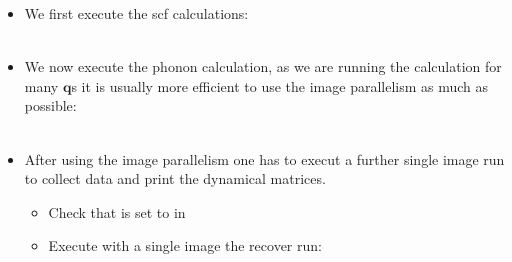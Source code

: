 \documentclass[landscape]{foils}
\begin{document}
\begin{itemize} 
	
	\item We first execute the scf calculations:\\
		\\ 
	\item We now execute the phonon calculation, as we are running the calculation for many  $\mathbf{q}$s it is usually more efficient 
		to use the image parallelism as much as possible: \\
	         \\ 
	\item After using the image parallelism one has to execut a further single image  run to collect data and print the dynamical matrices. 
		\begin{itemize}
		 	\item Check that  is set to \value{.true.} in 
			\item Execute with a  single image the recover run:\\
		\end{itemize}
	\end{itemize}
\end{document}
